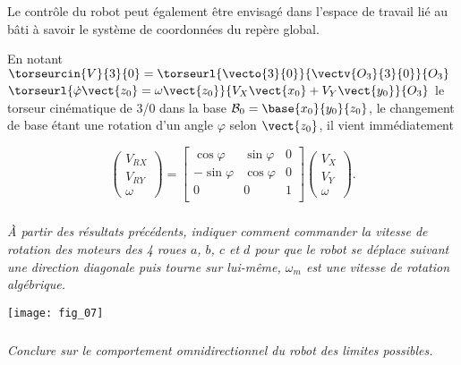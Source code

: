 \begin{multicols}{2}
Le contrôle du robot peut également être envisagé dans l'espace de travail lié au bâti à savoir le système de coordonnées du repère global.

En notant $\torseurcin{V}{3}{0}= \torseurl{\vecto{3}{0}}{\vectv{O_3}{3}{0}}{O_3}$ 
$\torseurl{\dot{\varphi}\vect{z_0}=\omega\vect{z_0}}{V_X\vect{x_0}+V_Y\vect{y_0}}{O_3}$ 
le torseur cinématique de 3/0 dans la base $\mathcal{B}_0=\base{x_0}{y_0}{z_0}$,
le changement de base étant une rotation d'un angle $\varphi$ selon $\vect{z_0}$, il vient immédiatement

$$
\begin{pmatrix} V_{RX} \\ V_{RY} \\ \omega \end{pmatrix}
=
\begin{bmatrix}  
\cos \varphi  &  \sin \varphi & 0 \\
- \sin \varphi & \cos \varphi & 0 \\
0 &  0 & 1 \\
\end{bmatrix}
\begin{pmatrix}
V_X \\ V_Y \\ \omega
\end{pmatrix}.
$$

\subparagraph{}
\textit{À partir des résultats précédents, indiquer comment commander la vitesse de rotation des moteurs des 4 roues $a$, $b$, $c$ et $d$ pour que le robot se déplace suivant une direction diagonale puis tourne sur lui-même, $\omega_m$ est une vitesse de rotation algébrique.}
\ifprof%
\begin{corrige}
\end{corrige}\else\fi

\begin{center}
\texttt{[image: fig\_07]}
\end{center}



\subparagraph{}
\textit{Conclure sur le comportement omnidirectionnel du robot des limites possibles.}
\ifprof%
\begin{corrige}
\end{corrige}\else\fi

\ifprof
\else
\end{multicols}
\fi


